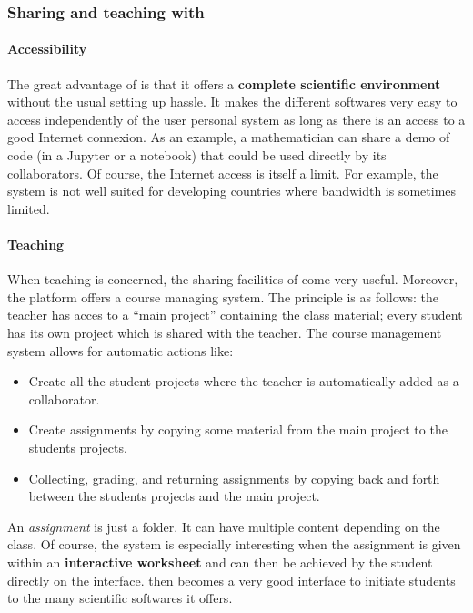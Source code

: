 \documentclass{deliverablereport}
\begin{document}
\subsubsection{Sharing and teaching with \SMC}

\paragraph{Accessibility}

The great advantage of \SMC is that it offers a \textbf{complete
  scientific environment} without the usual setting up hassle. It
makes the different softwares very easy to access independently of the
user personal system as long as there is an access to a good Internet
connexion. As an example, a mathematician can share a demo of code (in
a Jupyter or a \Sage notebook) that could be used directly by its
collaborators. Of course, the Internet access is itself a limit. For
example, the system is not well suited for developing countries where
bandwidth is sometimes limited.

\paragraph{Teaching}

When teaching is concerned, the sharing facilities of \SMC come very
useful.  Moreover, the platform offers a course managing system. The
principle is as follows: the teacher has acces to a ``main project''
containing the class material; every student has its own project which
is shared with the teacher. The course management system allows for
automatic actions like:

\begin{itemize}
\item Create all the student projects where the teacher is
  automatically added as a collaborator.
\item Create assignments by copying some material from the main
  project to the students projects.
\item Collecting, grading, and returning assignments by copying back
  and forth between the students projects and the main project.
\end{itemize}

An \emph{assignment} is just a folder. It can have multiple content
depending on the class.  Of course, the system is especially
interesting when the assignment is given within an \textbf{interactive
  worksheet} and can then be achieved by the student directly on the
interface. \SMC then becomes a very good interface to initiate
students to the many scientific softwares it offers.
\end{document}
